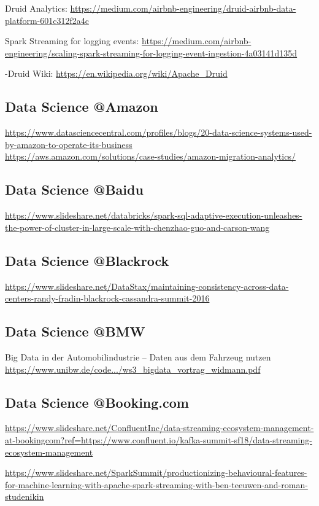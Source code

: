 \documentclass[12pt]{scrartcl} %
\begin{document}
Druid Analytics:
\url{https://medium.com/airbnb-engineering/druid-airbnb-data-platform-601c312f2a4c}

Spark Streaming for logging events:
\url{https://medium.com/airbnb-engineering/scaling-spark-streaming-for-logging-event-ingestion-4a03141d135d}

-Druid Wiki:
\url{https://en.wikipedia.org/wiki/Apache_Druid}

\subsection{Data Science @Amazon}
\url{https://www.datasciencecentral.com/profiles/blogs/20-data-science-systems-used-by-amazon-to-operate-its-business} \\
\url{https://aws.amazon.com/solutions/case-studies/amazon-migration-analytics/}

\subsection{Data Science @Baidu}
\url{https://www.slideshare.net/databricks/spark-sql-adaptive-execution-unleashes-the-power-of-cluster-in-large-scale-with-chenzhao-guo-and-carson-wang}

\subsection{Data Science @Blackrock}
\url{https://www.slideshare.net/DataStax/maintaining-consistency-across-data-centers-randy-fradin-blackrock-cassandra-summit-2016}

\subsection{Data Science @BMW}
Big Data in der Automobilindustrie – Daten aus dem Fahrzeug nutzen \url{https://www.unibw.de/code.../ws3_bigdata_vortrag_widmann.pdf}

\subsection{Data Science @Booking.com}
\url{https://www.slideshare.net/ConfluentInc/data-streaming-ecosystem-management-at-bookingcom?ref=https://www.confluent.io/kafka-summit-sf18/data-streaming-ecosystem-management}

\url{https://www.slideshare.net/SparkSummit/productionizing-behavioural-features-for-machine-learning-with-apache-spark-streaming-with-ben-teeuwen-and-roman-studenikin}
\end{document}
